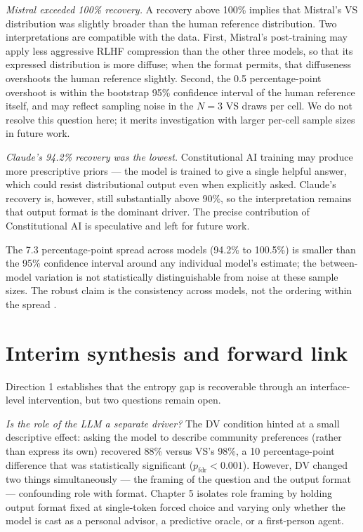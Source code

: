 \textit{Mistral exceeded 100\% recovery.} A recovery above 100\% implies
that Mistral's VS distribution was slightly broader than the human
reference distribution. Two interpretations are compatible with the data.
First, Mistral's post-training may apply less aggressive RLHF compression
than the other three models, so that its expressed distribution is more
diffuse; when the format permits, that diffuseness overshoots the human
reference slightly. Second, the 0.5 percentage-point overshoot is
within the bootstrap 95\% confidence interval of the human reference
itself, and may reflect sampling noise in the $N{=}3$ VS draws per cell.
We do not resolve this question here; it merits investigation with larger
per-cell sample sizes in future work.

\textit{Claude's 94.2\% recovery was the lowest.} Constitutional AI
training \citep{bai-2022-constitutional} may produce more prescriptive
priors — the model is trained to give a single helpful answer, which
could resist distributional output even when explicitly asked. Claude's
recovery is, however, still substantially above 90\%, so the
interpretation remains that output format is the dominant driver. The
precise contribution of Constitutional AI is speculative and left for
future work.

The 7.3 percentage-point spread across models (94.2\% to 100.5\%) is
smaller than the 95\% confidence interval around any individual model's
estimate; the between-model variation is not statistically distinguishable
from noise at these sample sizes. The robust claim is the consistency
across models, not the ordering within the spread \citep{kirk-2024-rlhf-diversity}.

\section{Interim synthesis and forward link}
\label{sec:d1_synthesis}

Direction 1 establishes that the entropy gap is recoverable through an
interface-level intervention, but two questions remain open.

\textit{Is the role of the LLM a separate driver?} The DV condition hinted
at a small descriptive effect: asking the model to describe community
preferences (rather than express its own) recovered 88\% versus VS's
98\%, a 10 percentage-point difference that was statistically significant
($p_{\text{fdr}} < 0.001$). However, DV changed two things simultaneously
— the framing of the question and the output format — confounding role
with format. Chapter 5 isolates role framing by holding output format
fixed at single-token forced choice and varying only whether the model is
cast as a personal advisor, a predictive oracle, or a first-person agent.

